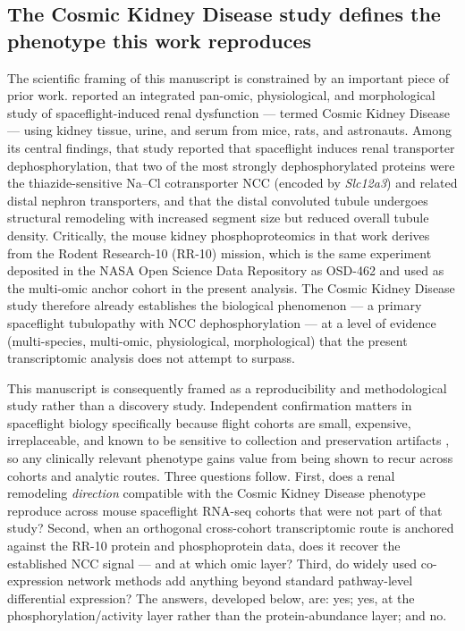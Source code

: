 \documentclass[11pt]{article}
\newcommand{\gene}[1]{\textit{#1}}
\begin{document}
\subsection{The Cosmic Kidney Disease study defines the phenotype this work reproduces}

The scientific framing of this manuscript is constrained by an important piece of prior work. \citet{siew2024cosmic} reported an integrated pan-omic, physiological, and morphological study of spaceflight-induced renal dysfunction --- termed Cosmic Kidney Disease --- using kidney tissue, urine, and serum from mice, rats, and astronauts. Among its central findings, that study reported that spaceflight induces renal transporter dephosphorylation, that two of the most strongly dephosphorylated proteins were the thiazide-sensitive Na--Cl cotransporter NCC (encoded by \gene{Slc12a3}) and related distal nephron transporters, and that the distal convoluted tubule undergoes structural remodeling with increased segment size but reduced overall tubule density. Critically, the mouse kidney phosphoproteomics in that work derives from the Rodent Research-10 (RR-10) mission, which is the same experiment deposited in the NASA Open Science Data Repository as OSD-462 and used as the multi-omic anchor cohort in the present analysis. The Cosmic Kidney Disease study therefore already establishes the biological phenomenon --- a primary spaceflight tubulopathy with NCC dephosphorylation --- at a level of evidence (multi-species, multi-omic, physiological, morphological) that the present transcriptomic analysis does not attempt to surpass.

This manuscript is consequently framed as a reproducibility and methodological study rather than a discovery study. Independent confirmation matters in spaceflight biology specifically because flight cohorts are small, expensive, irreplaceable, and known to be sensitive to collection and preservation artifacts \citep{galazka2020rnaseq,preserve2016}, so any clinically relevant phenotype gains value from being shown to recur across cohorts and analytic routes. Three questions follow. First, does a renal remodeling \emph{direction} compatible with the Cosmic Kidney Disease phenotype reproduce across mouse spaceflight RNA-seq cohorts that were not part of that study? Second, when an orthogonal cross-cohort transcriptomic route is anchored against the RR-10 protein and phosphoprotein data, does it recover the established NCC signal --- and at which omic layer? Third, do widely used co-expression network methods add anything beyond standard pathway-level differential expression? The answers, developed below, are: yes; yes, at the phosphorylation/activity layer rather than the protein-abundance layer; and no.
\end{document}
